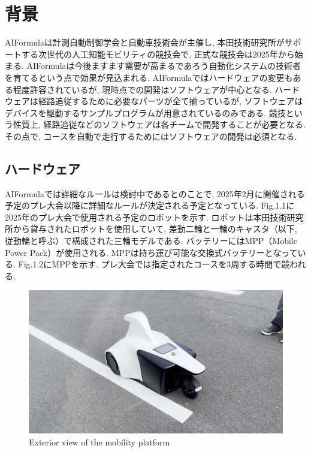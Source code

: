 
\section{背景}
AIFormulaは計測自動制御学会と自動車技術会が主催し, 本田技術研究所がサポートする次世代の人工知能モビリティの競技会で, 正式な競技会は2025年から始まる.
\cite{aiformula}
AIFormulaは今後ますます需要が高まるであろう自動化システムの技術者を育てるという点で効果が見込まれる.
AIFormulaではハードウェアの変更もある程度許容されているが, 現時点での開発はソフトウェアが中心となる.
ハードウェアは経路追従するために必要なパーツが全て揃っているが, ソフトウェアはデバイスを駆動するサンプルプログラムが用意されているのみである.
\cite{aiformula-support}
競技という性質上, 経路追従などのソフトウェアは各チームで開発することが必要となる.
\cite{aiformula-chibakou}
\cite{aiformula-repo}
その点で, コースを自動で走行するためにはソフトウェアの開発は必須となる.

\subsection{ハードウェア}
AIFormulaでは詳細なルールは検討中であるとのことで, 2025年2月に開催される予定のプレ大会以降に詳細なルールが決定される予定となっている.
Fig.1.1に2025年のプレ大会で使用される予定のロボットを示す.
ロボットは本田技術研究所から貸与されたロボットを使用していて, 差動二輪と一輪のキャスタ（以下, 従動輪と呼ぶ）で構成された三輪モデルである.
バッテリーにはMPP（Mobile Power Pack）が使用される. MPPは持ち運び可能な交換式バッテリーとなっている. Fig.1.2にMPPを示す.
プレ大会では指定されたコースを3周する時間で競われる.

\begin{figure}[H]
  \centering
 \includegraphics[keepaspectratio, scale=0.6]
      {images/ExteriorViewOfTheMobilityPlatform.png}
 \caption{Exterior view of the mobility platform}
 \label{fig:robot view}
\end{figure}

